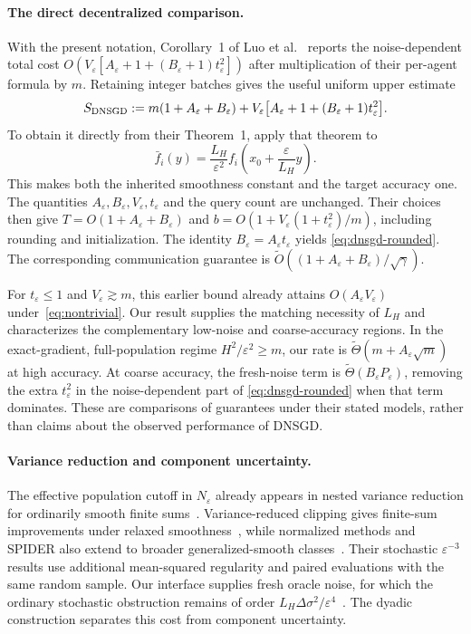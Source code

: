 \documentclass[11pt,a4paper]{article}
\newcommand{\eps}{\varepsilon}
\theoremstyle{remark}
\begin{document}
\paragraph{The direct decentralized comparison.}
With the present notation, Corollary~1 of Luo et al.~\cite{relaxed2025}
reports the noise-dependent total cost
$O(V_\eps[A_\eps+1+(B_\eps+1)t_\eps^2])$ after multiplication of their
per-agent formula by $m$. Retaining integer batches gives the useful
uniform upper estimate
\begin{equation}
 S_{\rm DNSGD}:=
 m(1+A_\eps+B_\eps)
 +V_\eps\bigl[A_\eps+1+(B_\eps+1)t_\eps^2\bigr].
 \label{eq:dnsgd-rounded}
\end{equation}
To obtain it directly from their Theorem~1, apply that theorem to
\[
 \bar f_i(y)=\frac{L_H}{\eps^2}
             f_i\!\left(x_0+\frac{\eps}{L_H}y\right).
\]
This makes both the inherited smoothness constant and the target accuracy
one. The quantities $A_\eps,B_\eps,V_\eps,t_\eps$ and the query count
are unchanged. Their choices
then give $T=O(1+A_\eps+B_\eps)$ and
$b=O(1+V_\eps(1+t_\eps^2)/m)$, including rounding and initialization.
The identity $B_\eps=A_\eps t_\eps$ yields
\eqref{eq:dnsgd-rounded}. The corresponding communication guarantee is
$\widetilde O((1+A_\eps+B_\eps)/\sqrt\gamma)$.

For $t_\eps\le1$ and $V_\eps\gtrsim m$, this earlier bound already attains
$O(A_\eps V_\eps)$ under~\eqref{eq:nontrivial}. Our result supplies the
matching necessity of $L_H$ and characterizes the complementary low-noise
and coarse-accuracy regions. In the exact-gradient, full-population regime
$H^2/\eps^2\ge m$, our rate is
$\widetilde\Theta(m+A_\eps\sqrt m)$ at high accuracy. At coarse accuracy,
the fresh-noise term is $\widetilde\Theta(B_\eps P_\eps)$, removing the
extra $t_\eps^2$ in the noise-dependent part of
\eqref{eq:dnsgd-rounded} when that term dominates. These are comparisons
of guarantees under their stated models, rather than claims about the
observed performance of DNSGD.

\paragraph{Variance reduction and component uncertainty.}
The effective population cutoff in $N_\eps$ already appears in nested
variance reduction for ordinarily smooth finite sums~\cite{snvrg2018}.
Variance-reduced clipping gives finite-sum improvements under relaxed
smoothness~\cite{reisizadeh2023}, while normalized methods and SPIDER also
extend to broader generalized-smooth classes~\cite{chen2023}.
Their stochastic $\eps^{-3}$ results use additional mean-squared regularity
and paired evaluations with the same random sample. Our interface supplies
fresh oracle noise, for which the ordinary stochastic obstruction
remains of order $L_H\Delta\sigma^2/\eps^4$~\cite{arjevani2022}.
The dyadic construction separates this cost from component uncertainty.
\end{document}
